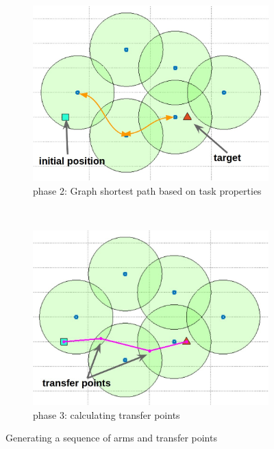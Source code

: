 \documentclass[english]{article}
\theoremstyle{definition}
\begin{document}
\begin{figure}[t]
    \begin{subfigure}[b]{0.4\textwidth}
        \includegraphics[width=\textwidth]{task_assignment}
        \caption{phase 2: Graph shortest path based on task properties }
        \label{fig:task_assignment}
    \end{subfigure}
    ~~~~
    \begin{subfigure}[b]{0.4\textwidth}
        \includegraphics[width=\textwidth]{transfer_points}
        \caption{phase 3: calculating transfer points}
        \label{fig:transfer_points}
    \end{subfigure}
    \caption{Generating a sequence of arms and transfer points}\label{fig:animals}
\end{figure}
\end{document}
